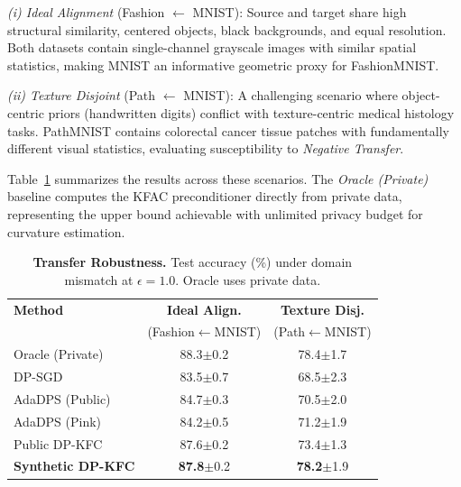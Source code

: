 \documentclass{article}
\theoremstyle{plain}
\theoremstyle{definition}
\theoremstyle{remark}
\begin{document}
\emph{(i) Ideal Alignment} (Fashion $\leftarrow$ MNIST): Source and target share high structural similarity, centered objects, black backgrounds, and equal resolution. Both datasets contain single-channel grayscale images with similar spatial statistics, making MNIST an informative geometric proxy for FashionMNIST. 

\emph{(ii) Texture Disjoint} (Path $\leftarrow$ MNIST): A challenging scenario where object-centric priors (handwritten digits) conflict with texture-centric medical histology tasks. PathMNIST contains colorectal cancer tissue patches with fundamentally different visual statistics, evaluating susceptibility to \emph{Negative Transfer}.

Table~\ref{tab:dynamic_summary} summarizes the results across these scenarios. The \emph{Oracle (Private)} baseline computes the KFAC preconditioner directly from private data, representing the upper bound achievable with unlimited privacy budget for curvature estimation.

\begin{table}[t]
\centering
\caption{\textbf{Transfer Robustness.} Test accuracy (\%) under domain mismatch at $\epsilon=1.0$. Oracle uses private data.}
\label{tab:dynamic_summary}
\renewcommand{\arraystretch}{1.2}
\small
\begin{tabular}{lcc}
\toprule
\textbf{Method} & \textbf{Ideal Align.} & \textbf{Texture Disj.} \\
& (Fashion$\leftarrow$MNIST) & (Path$\leftarrow$MNIST) \\
\midrule
Oracle (Private) & 88.3{\scriptsize$\pm$0.2} & 78.4{\scriptsize$\pm$1.7} \\
\midrule
DP-SGD & 83.5{\scriptsize$\pm$0.7} & 68.5{\scriptsize$\pm$2.3} \\
AdaDPS (Public) & 84.7{\scriptsize$\pm$0.3} & 70.5{\scriptsize$\pm$2.0} \\
AdaDPS (Pink) & 84.2{\scriptsize$\pm$0.5} & 71.2{\scriptsize$\pm$1.9} \\
Public DP-KFC & 87.6{\scriptsize$\pm$0.2} & 73.4{\scriptsize$\pm$1.3} \\
\textbf{Synthetic DP-KFC} & \textbf{87.8}{\scriptsize$\pm$0.2} & \textbf{78.2}{\scriptsize$\pm$1.9} \\
\bottomrule
\end{tabular}
\end{table}
\end{document}
